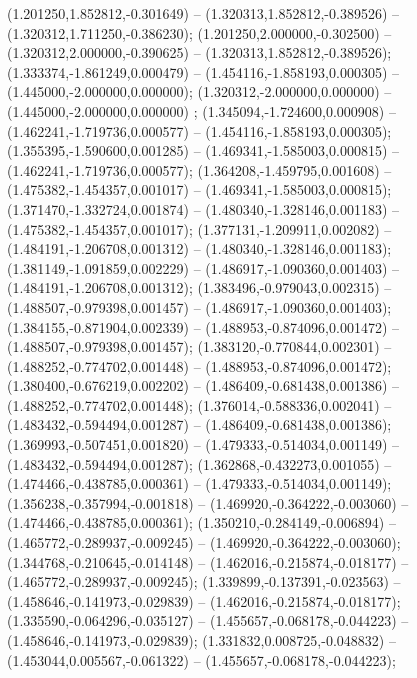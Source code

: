  (1.201250,1.852812,-0.301649) -- (1.320313,1.852812,-0.389526) -- (1.320312,1.711250,-0.386230);
 (1.201250,2.000000,-0.302500) -- (1.320312,2.000000,-0.390625) -- (1.320313,1.852812,-0.389526);
 (1.333374,-1.861249,0.000479) -- (1.454116,-1.858193,0.000305) -- (1.445000,-2.000000,0.000000);
 (1.320312,-2.000000,0.000000) -- (1.445000,-2.000000,0.000000) ;
 (1.345094,-1.724600,0.000908) -- (1.462241,-1.719736,0.000577) -- (1.454116,-1.858193,0.000305);
 (1.355395,-1.590600,0.001285) -- (1.469341,-1.585003,0.000815) -- (1.462241,-1.719736,0.000577);
 (1.364208,-1.459795,0.001608) -- (1.475382,-1.454357,0.001017) -- (1.469341,-1.585003,0.000815);
 (1.371470,-1.332724,0.001874) -- (1.480340,-1.328146,0.001183) -- (1.475382,-1.454357,0.001017);
 (1.377131,-1.209911,0.002082) -- (1.484191,-1.206708,0.001312) -- (1.480340,-1.328146,0.001183);
 (1.381149,-1.091859,0.002229) -- (1.486917,-1.090360,0.001403) -- (1.484191,-1.206708,0.001312);
 (1.383496,-0.979043,0.002315) -- (1.488507,-0.979398,0.001457) -- (1.486917,-1.090360,0.001403);
 (1.384155,-0.871904,0.002339) -- (1.488953,-0.874096,0.001472) -- (1.488507,-0.979398,0.001457);
 (1.383120,-0.770844,0.002301) -- (1.488252,-0.774702,0.001448) -- (1.488953,-0.874096,0.001472);
 (1.380400,-0.676219,0.002202) -- (1.486409,-0.681438,0.001386) -- (1.488252,-0.774702,0.001448);
 (1.376014,-0.588336,0.002041) -- (1.483432,-0.594494,0.001287) -- (1.486409,-0.681438,0.001386);
 (1.369993,-0.507451,0.001820) -- (1.479333,-0.514034,0.001149) -- (1.483432,-0.594494,0.001287);
 (1.362868,-0.432273,0.001055) -- (1.474466,-0.438785,0.000361) -- (1.479333,-0.514034,0.001149);
 (1.356238,-0.357994,-0.001818) -- (1.469920,-0.364222,-0.003060) -- (1.474466,-0.438785,0.000361);
 (1.350210,-0.284149,-0.006894) -- (1.465772,-0.289937,-0.009245) -- (1.469920,-0.364222,-0.003060);
 (1.344768,-0.210645,-0.014148) -- (1.462016,-0.215874,-0.018177) -- (1.465772,-0.289937,-0.009245);
 (1.339899,-0.137391,-0.023563) -- (1.458646,-0.141973,-0.029839) -- (1.462016,-0.215874,-0.018177);
 (1.335590,-0.064296,-0.035127) -- (1.455657,-0.068178,-0.044223) -- (1.458646,-0.141973,-0.029839);
 (1.331832,0.008725,-0.048832) -- (1.453044,0.005567,-0.061322) -- (1.455657,-0.068178,-0.044223);
